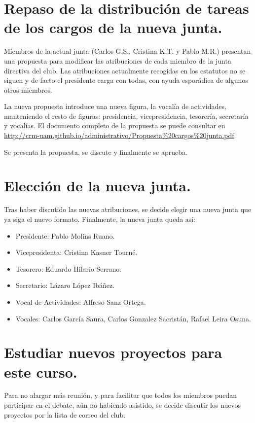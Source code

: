 \documentclass[a4paper]{article}
\begin{document}
\section{Repaso de la distribución de tareas de los cargos de la nueva junta.}

Miembros de la actual junta (Carlos G.S., Cristina K.T. y Pablo M.R.) presentan una propuesta para modificar las atribuciones de cada miembro de la junta directiva del club. Las atribuciones actualmente recogidas en los estatutos no se siguen y de facto el presidente carga con todas, con ayuda esporádica de algunos otros miembros. 

La nueva propuesta introduce una nueva figura, la vocalía de actividades, manteniendo el resto de figuras: presidencia, vicepresidencia, tesorería, secretaría y vocalías. El documento completo de la propuesta se puede consultar en \url{http://crm-uam.github.io/administrativo/Propuesta\%20cargos\%20junta.pdf}.

Se presenta la propuesta, se discute y finalmente se aprueba.

\section{Elección de la nueva junta.}

Tras haber discutido las nuevas atribuciones, se decide elegir una nueva junta que ya siga el nuevo formato. Finalmente, la nueva junta queda así:

\begin{itemize}
\item Presidente: Pablo Molins Ruano.
\item Vicepresidenta: Cristina Kasner Tourné.
\item Tesorero: Eduardo Hilario Serrano.
\item Secretario: Lázaro López Ibáñez.
\item Vocal de Actividades: Alfreso Sanz Ortega.
\item Vocales: Carlos García Saura, Carlos Gonzalez Sacristán, Rafael Leira Osuna.
\end{itemize}

\section{Estudiar nuevos proyectos para este curso.}

Para no alargar más reunión, y para facilitar que todos los miembros puedan participar en el debate, aún no habiendo asistido, se decide discutir los nuevos proyectos por la lista de correo del club.
\end{document}
